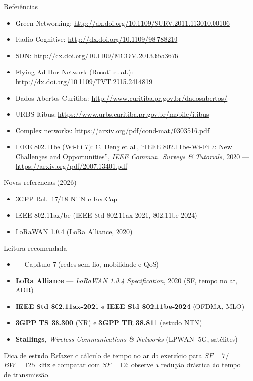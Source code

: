 \documentclass[aspectratio=169,11pt]{beamer}
\begin{document}
\begin{frame}{Referências}
  \begin{small}
  \begin{itemize}
    \item Green Networking: \url{http://dx.doi.org/10.1109/SURV.2011.113010.00106}
    \item Radio Cognitive: \url{http://dx.doi.org/10.1109/98.788210}
    \item SDN: \url{http://dx.doi.org/10.1109/MCOM.2013.6553676}
    \item Flying Ad Hoc Network (Rosati et al.): \url{http://dx.doi.org/10.1109/TVT.2015.2414819}
    \item Dados Abertos Curitiba: \url{http://www.curitiba.pr.gov.br/dadosabertos/}
    \item URBS Itibus: \url{https://www.urbs.curitiba.pr.gov.br/mobile/itibus}
    \item Complex networks: \url{https://arxiv.org/pdf/cond-mat/0303516.pdf}
    \item IEEE 802.11be (Wi-Fi 7): C. Deng et al., ``IEEE 802.11be-Wi-Fi 7: New Challenges and Opportunities'', \emph{IEEE Commun. Surveys \& Tutorials}, 2020 --- \url{https://arxiv.org/pdf/2007.13401.pdf}
  \end{itemize}
  \end{small}
  \begin{block}{Novas referências (2026)}
    \begin{itemize}
      \item 3GPP Rel.\ 17/18 NTN e RedCap
      \item IEEE 802.11ax/be (IEEE Std 802.11ax-2021, 802.11be-2024)
      \item LoRaWAN 1.0.4 (LoRa Alliance, 2020)
    \end{itemize}
  \end{block}
\end{frame}

\begin{frame}{Leitura recomendada}
  \begin{itemize}
    \item \textbf{\kurose{}} --- Capítulo 7 (redes sem fio, mobilidade e QoS)
    \item \textbf{LoRa Alliance} --- \emph{LoRaWAN 1.0.4 Specification}, 2020 (SF, tempo no ar, ADR)
    \item \textbf{IEEE Std 802.11ax-2021} e \textbf{IEEE Std 802.11be-2024} (OFDMA, MLO)
    \item \textbf{3GPP TS 38.300} (NR) e \textbf{3GPP TR 38.811} (estudo NTN)
    \item \textbf{Stallings}, \emph{Wireless Communications \& Networks} (LPWAN, 5G, satélites)
  \end{itemize}
  \begin{alertblock}{Dica de estudo}
    Refazer o cálculo de tempo no ar do exercício para $SF=7$/$BW=125$~kHz e comparar com $SF=12$: observe a redução drástica do tempo de transmissão.
  \end{alertblock}
\end{frame}
\end{document}
